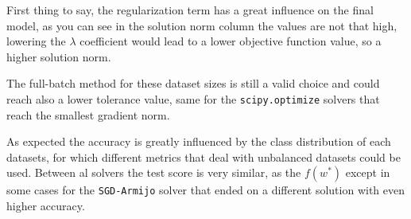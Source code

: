


First thing to say, the regularization term has a great influence on the final model, as you can see in the solution norm column the values are not that high, %
lowering the $\lambda$ coefficient would lead to a lower objective function value, so a higher solution norm.


The full-batch method for these dataset sizes is still a valid choice and could reach also a lower tolerance value, same for the \texttt{scipy.optimize} solvers that reach the smallest gradient norm.%

As expected the accuracy is greatly influenced by the class distribution of each datasets, for which different metrics that deal with unbalanced datasets could be used. Between al solvers the test score is very similar, as the $f(w^\ast)$ except in some cases for the \texttt{SGD-Armijo} solver that ended on a different solution with even higher accuracy.



